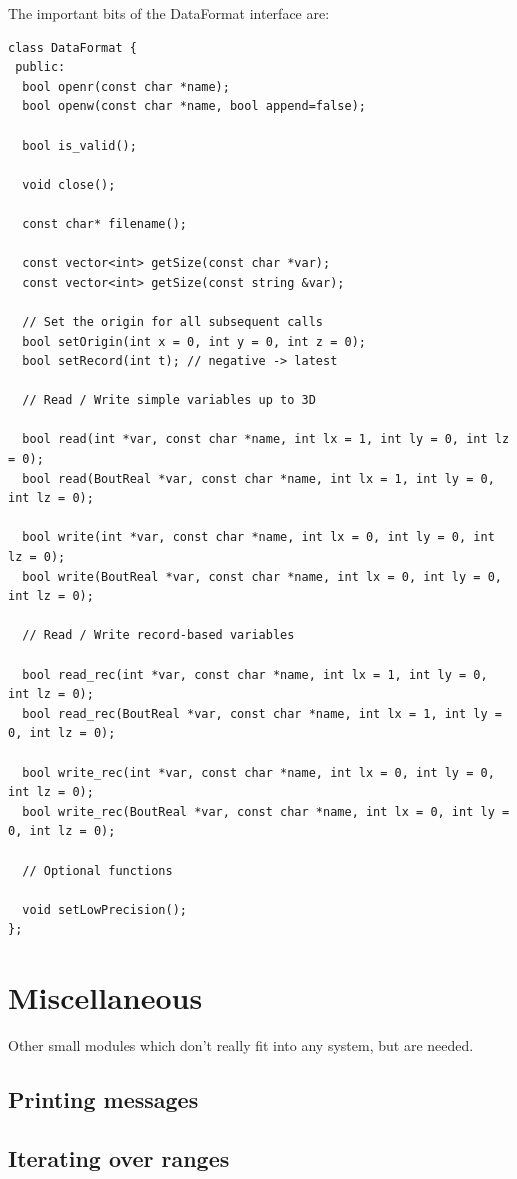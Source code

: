 \documentclass[12pt]{article}
\begin{document}
The important bits of the DataFormat interface are: 
\begin{lstlisting}
class DataFormat {
 public:
  bool openr(const char *name);
  bool openw(const char *name, bool append=false);
  
  bool is_valid();
  
  void close();
  
  const char* filename();

  const vector<int> getSize(const char *var);
  const vector<int> getSize(const string &var);

  // Set the origin for all subsequent calls
  bool setOrigin(int x = 0, int y = 0, int z = 0); 
  bool setRecord(int t); // negative -> latest
  
  // Read / Write simple variables up to 3D

  bool read(int *var, const char *name, int lx = 1, int ly = 0, int lz = 0);
  bool read(BoutReal *var, const char *name, int lx = 1, int ly = 0, int lz = 0);

  bool write(int *var, const char *name, int lx = 0, int ly = 0, int lz = 0);
  bool write(BoutReal *var, const char *name, int lx = 0, int ly = 0, int lz = 0);

  // Read / Write record-based variables

  bool read_rec(int *var, const char *name, int lx = 1, int ly = 0, int lz = 0);
  bool read_rec(BoutReal *var, const char *name, int lx = 1, int ly = 0, int lz = 0);

  bool write_rec(int *var, const char *name, int lx = 0, int ly = 0, int lz = 0);
  bool write_rec(BoutReal *var, const char *name, int lx = 0, int ly = 0, int lz = 0);

  // Optional functions
  
  void setLowPrecision();
};
\end{lstlisting}


\section{Miscellaneous}

Other small modules which don't really fit into any system, but are needed.


\subsection{Printing messages}


\subsection{Iterating over ranges}
\label{sec:rangeiterator}
\end{document}
